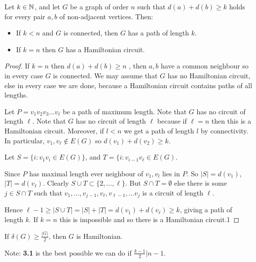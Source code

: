 \documentclass[10pt,a4paper]{article}
\begin{document}
\begin{theorem}
Let $k\in\mathbb{N}$, and let $G$ be a graph of order $n$ such that $d(a)+d(b)\geq k$ holds for every pair $a,b$ of non-adjacent vertices. Then:
\begin{itemize}
\item If $k<n$ and $G$ is connected, then $G$ has a path of length $k$.
\item If $k=n$ then $G$ has a Hamiltonian circuit.
\end{itemize}
\end{theorem}
\begin{proof}
If $k=n$ then $d(a)+d(b)\geq n$ , then $a,b$ have a common neighbour so in every case $G$ is connected. We may assume that $G$ has no Hamiltonian circuit, else in every case we are done, because a Hamiltonian circuit contains paths of all lengths.

Let $P = v_1 v_2 v_3 \ldots v_\ell$ be a path of maximum length. Note that $G$ has no circuit of length $\ell$. Note that $G$ has no circuit of length $\ell$ because if $\ell=n$ then this is a Hamiltonian circuit. Moreover, if $l<n$ we get a path of length $l$ by connectivity. In particular, $v_1, v_\ell \notin E(G)$ so $d(v_1) + d(v_2) \geq k$.
\begin{center}
\end{center}
Let $S = \{i: v_1 v_i \in E(G)\}$, and $T = \{i: v_{i-1}v_\ell \in E(G)$.

Since $P$ has maximal length ever neighbour of $v_1, v_l$ lies in $P$. So $|S|=d(v_1)$, $|T|=d(v_\ell)$. Clearly $S\cup T \subset \{2,\ldots, \ell\}$. But $S\cap T = \emptyset$ else there is some $j \in S\cap T$ such that $v_1, \ldots, v_{j-1}, v_\ell, v_{\ell-1},\ldots v_j$ is a circuit of length $\ell$.

Hence $\ell-1 \geq |S\cup T| = |S|+|T| = d(v_1) + d(v_\ell) \geq k$, giving a path of length $k$. If $k=n$ this is impossible and so there is a Hamiltonian circuit.1
\end{proof}

\begin{corollary}[Dirac]
If $\delta(G) \geq \frac{|G|}{2}$, then $G$ is Hamiltonian.
\end{corollary}
Note: \textbf{3.1} is the best possible we can do if $\frac{k-1}{2}|n-1$.
\end{document}
